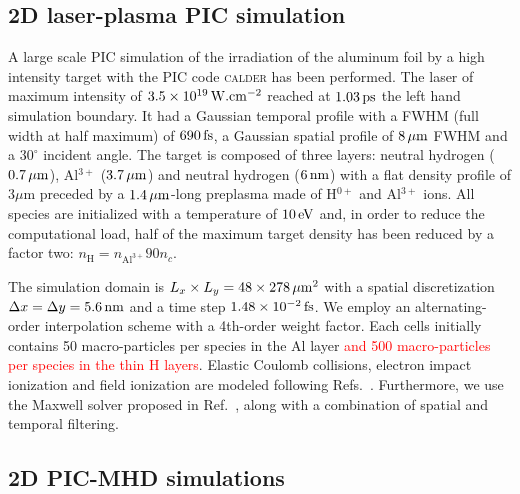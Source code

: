 \documentclass[aps,twocolumn,showpacs,superscriptaddress]{revtex4}
\begin{document}
\subsection*{2D laser-plasma PIC simulation}

A large scale PIC simulation of the irradiation of the aluminum foil by a high intensity target with the PIC code \textsc{calder} has been performed.
The laser of maximum intensity of $3.5 \times 10^{19}\,\rm W.cm^{-2}$ reached at $1.03\,\rm ps$ the left hand simulation boundary. It had a Gaussian temporal profile with a FWHM (full width at half maximum) of $690\,\rm fs$,  a Gaussian spatial profile of $8\,\rm \mu m$ FWHM and a $30^\circ$ incident angle. The target is composed of three layers: neutral hydrogen ($0.7\,\rm \mu m$), Al$^{3+}$ ($3.7\,\rm \mu m$) and neutral hydrogen ($6\,\rm nm$) with a flat density profile of $3 \mu$m preceded by a $1.4\,\rm \mu m$-long preplasma made of H$^{0+}$ and Al$^{3+}$ ions. All species are initialized with a temperature of $10\,\rm eV$ and, in order to reduce the computational load, half of the maximum target density has been reduced by a factor two: $n_\mathrm{H} = n_{\mathrm{Al}^{3+}}90 n_c$.

The simulation domain is $L_x\times L_y = 48 \times 278\,\rm \mu m^2$ with a spatial discretization $\Delta x = \Delta y = 5.6\,\rm nm$ and a time step
$1.48\times 10^{-2}\,\rm fs$. We employ an alternating-order interpolation scheme \cite{CPC_Sokolov_2013} with a 4th-order weight factor. Each cells initially contains
50 macro-particles per species in the Al layer \textcolor{red}{and 500 macro-particles per species in the thin H layers}. Elastic Coulomb collisions, electron impact
ionization and field ionization are modeled following Refs.~\cite{POP_Nuter_2011, POP_Perez_2012}. Furthermore, we use the Maxwell solver proposed in Ref.~\cite{PRSTAB_Lehe_2013}, along with a combination of spatial \cite{JCP_Vay_2011} and temporal \cite{JCP_Friedman_1990} filtering.

\subsection*{2D PIC-MHD simulations}
\end{document}
